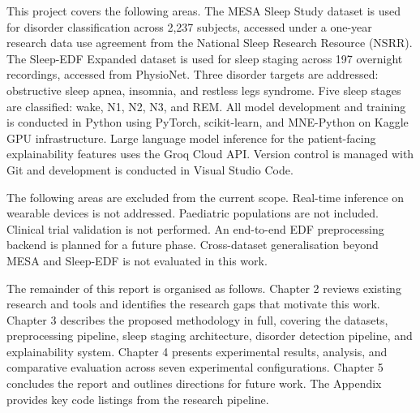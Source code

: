 This project covers the following areas. The MESA Sleep Study dataset is used for disorder classification across 2,237 subjects, accessed under a one-year research data use agreement from the National Sleep Research Resource (NSRR). The Sleep-EDF Expanded dataset is used for sleep staging across 197 overnight recordings, accessed from PhysioNet. Three disorder targets are addressed: obstructive sleep apnea, insomnia, and restless legs syndrome. Five sleep stages are classified: wake, N1, N2, N3, and REM. All model development and training is conducted in Python using PyTorch, scikit-learn, and MNE-Python on Kaggle GPU infrastructure. Large language model inference for the patient-facing explainability features uses the Groq Cloud API. Version control is managed with Git and development is conducted in Visual Studio Code.

The following areas are excluded from the current scope. Real-time inference on wearable devices is not addressed. Paediatric populations are not included. Clinical trial validation is not performed. An end-to-end EDF preprocessing backend is planned for a future phase. Cross-dataset generalisation beyond MESA and Sleep-EDF is not evaluated in this work.

The remainder of this report is organised as follows. Chapter 2 reviews existing research and tools and identifies the research gaps that motivate this work. Chapter 3 describes the proposed methodology in full, covering the datasets, preprocessing pipeline, sleep staging architecture, disorder detection pipeline, and explainability system. Chapter 4 presents experimental results, analysis, and comparative evaluation across seven experimental configurations. Chapter 5 concludes the report and outlines directions for future work. The Appendix provides key code listings from the research pipeline.
